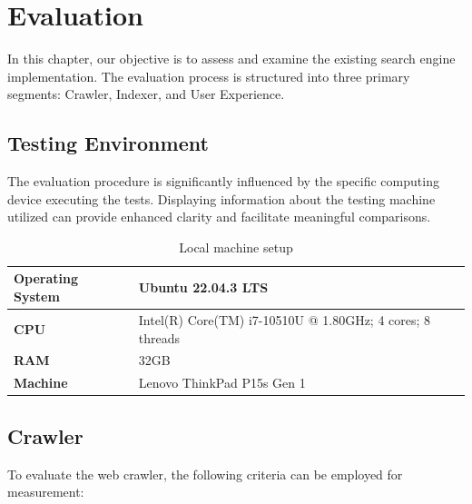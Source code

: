 \chapter{Evaluation}
\label{chap:evaluation}
In this chapter, our objective is to assess and examine the existing search engine implementation. The evaluation process is structured into three primary segments: Crawler, Indexer, and User Experience.

\section{Testing Environment}
The evaluation procedure is significantly influenced by the specific computing device executing the tests. Displaying information about the testing machine utilized can provide enhanced clarity and facilitate meaningful comparisons.


\begin{table}[ht] 
{\footnotesize
\begin{tabular}{ P{2.5cm} ||P{11.1cm}  }      %
 \hline \hline
\textbf{Operating System} & Ubuntu 22.04.3 LTS \T\B 
\\ 
\hline
\textbf{CPU} & Intel(R) Core(TM) i7-10510U @ 1.80GHz; 4 cores; 8 threads \T\B 
\\ 
\hline
\textbf{RAM} & 32GB\T\B 
\\ 
\hline
\textbf{Machine} & Lenovo ThinkPad P15s Gen 1\T\B 
\\ 
\hline \hline
    \end{tabular}
}
  \captionsetup{justification=centering,margin=2cm}
  \caption{Local machine setup}
\end{table}

\section{Crawler}  

To evaluate the web crawler, the following criteria can be employed for measurement:



